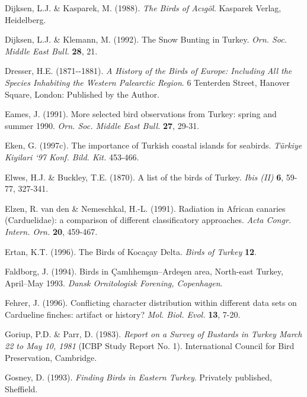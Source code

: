 \documentclass[
  10.5pt,
  a4paper,
  DIV=11,
  numbers=noendperiod,
  twocolumn]{scrreprt}
\newlength{\cslhangindent}
\newenvironment{CSLReferences}[2] %
 {\begin{list}{}{%
  \setlength{\itemindent}{0pt}
  \setlength{\leftmargin}{0pt}
  \setlength{\parsep}{0pt}
  \ifodd #1
   \setlength{\leftmargin}{\cslhangindent}
   \setlength{\itemindent}{-1\cslhangindent}
  \fi
  \setlength{\itemsep}{#2\baselineskip}}}
 {\end{list}}
\begin{document}
\begin{CSLReferences}{1}{1}
Dijksen, L.J. \& Kasparek, M. (1988). \emph{{The Birds of Acıgöl}}.
Kasparek Verlag, Heidelberg.

Dijksen, L.J. \& Klemann, M. (1992). {The Snow Bunting in Turkey}.
\emph{Orn. Soc. Middle East Bull.} \textbf{28}, 21.

Dresser, H.E. (1871-\/-1881). \emph{{A History of the Birds of Europe:
Including All the Species Inhabiting the Western Palearctic Region}}. 6
Tenterden Street, Hanover Square, London: Published by the Author.

Eames, J. (1991). {More selected bird observations from Turkey: spring
and summer 1990}. \emph{Orn. Soc. Middle East Bull.} \textbf{27}, 29-31.

Eken, G. (1997c). {The importance of Turkish coastal islands for
seabirds}. \emph{Türkiye Kiyilari `97 Konf. Bild. Kit.} 453-466.

Elwes, H.J. \& Buckley, T.E. (1870). {A list of the birds of Turkey}.
\emph{Ibis (II)} \textbf{6}, 59-77, 327-341.

Elzen, R. van den \& Nemeschkal, H.-L. (1991). {Radiation in African
canaries (Carduelidae): a comparison of different classificatory
approaches}. \emph{Acta Congr. Intern. Orn.} \textbf{20}, 459-467.

Ertan, K.T. (1996). {The Birds of Kocaçay Delta}. \emph{Birds of Turkey}
\textbf{12}.

Faldborg, J. (1994). {Birds in Çamlıhemşın--Ardeşen area, North-east
Turkey, April--May 1993}. \emph{Dansk Ornitologisk Forening,
Copenhagen}.

Fehrer, J. (1996). {Conflicting character distribution within different
data sets on Cardueline finches: artifact or history?} \emph{Mol. Biol.
Evol.} \textbf{13}, 7-20.

Goriup, P.D. \& Parr, D. (1983). \emph{{Report on a Survey of Bustards
in Turkey March 22 to May 10, 1981}} (ICBP Study Report No. 1).
International Council for Bird Preservation, Cambridge.

Gosney, D. (1993). \emph{{Finding Birds in Eastern Turkey}}. Privately
published, Sheffield.


\end{CSLReferences}
\end{document}
